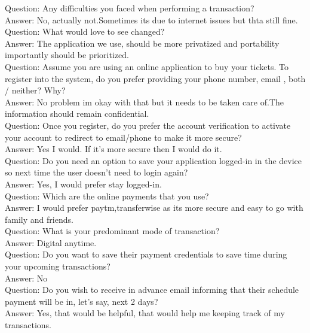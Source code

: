 \documentclass[11pt, english]{report}
\begin{document}
Question: Any difficulties you faced when performing a transaction?\\
Answer: No, actually not.Sometimes its due to internet issues but thta still fine.\\

Question: What would love to see changed?\\
Answer: The application we use, should be more privatized and portability importantly should be prioritized.\\

Question: Assume you are using an online application to buy your tickets. To register into the system, do you prefer providing your phone number, email , both / neither? Why?\\
Answer: No problem im okay with that but it needs to be taken care of.The information should remain confidential.\\
 
Question: Once you register, do you prefer the account verification to activate your account to redirect to email/phone to make it more secure?\\
Answer: Yes I would. If it’s more secure then I would do it.\\
 
Question: Do you  need an option to save your application logged-in in the device so next time the user doesn’t need to login again?\\
Answer: Yes, I would prefer stay logged-in.\\

Question: Which are the online payments that you use?\\
Answer: I would prefer paytm,transferwise as its more secure and easy to go with family and friends.\\
 
Question: What is your predominant mode of transaction?\\
Answer: Digital anytime.\\
 
Question: Do you want to save their payment credentials to save time during your upcoming transactions?\\
Answer: No\\
 
Question: Do you wish to receive in advance email informing that their schedule payment will be in, let’s say, next 2 days?\\
Answer: Yes, that would be helpful, that would help me keeping track of my transactions.\\
\end{document}
